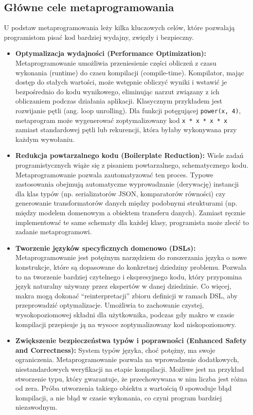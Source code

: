 \subsection{Główne cele metaprogramowania}
U podstaw metaprogramowania leży kilka kluczowych celów, które pozwalają programistom pisać kod bardziej wydajny, zwięzły i bezpieczny.
\begin{itemize}
    \item \textbf{Optymalizacja wydajności (Performance Optimization):}
    Metaprogramowanie umożliwia przeniesienie części obliczeń z czasu wykonania (runtime) do czasu kompilacji (compile-time).
    Kompilator, mając dostęp do stałych wartości, może wstępnie obliczyć wyniki i wstawić je bezpośrednio do kodu wynikowego, eliminując narzut związany z ich obliczaniem podczas działania aplikacji.
    Klasycznym przykładem jest rozwijanie pętli (ang. loop unrolling).
    Dla funkcji potęgującej \verb|power(x, 4)|, metaprogram może wygenerować zoptymalizowany kod \verb|x * x * x * x| zamiast standardowej pętli lub rekurencji, która byłaby wykonywana przy każdym wywołaniu.
    \item \textbf{Redukcja powtarzalnego kodu (Boilerplate Reduction):}
    Wiele zadań programistycznych wiąże się z pisaniem powtarzalnego, schematycznego kodu.
    Metaprogramowanie pozwala zautomatyzować ten proces.
    Typowe zastosowania obejmują automatyczne wyprowadzanie (derywację) instancji dla klas typów (np. serializatorów JSON, komparatorów równości) czy generowanie transformatorów danych między podobnymi strukturami (np. między modelem domenowym a obiektem transferu danych).
    Zamiast ręcznie implementować te same schematy dla każdej klasy, programista może zlecić to zadanie metaprogramowi.
    \item \textbf{Tworzenie języków specyficznych domenowo (DSLs):}
    Metaprogramowanie jest potężnym narzędziem do rozszerzania języka o nowe konstrukcje, które są dopasowane do konkretnej dziedziny problemu.
    Pozwala to na tworzenie bardziej czytelnego i ekspresyjnego kodu, który przypomina język naturalny używany przez ekspertów w danej dziedzinie.
    Co więcej, makra mogą dokonać \enquote{reinterpretacji} zbioru definicji w ramach DSL, aby przeprowadzić optymalizacje.
    Umożliwia to zachowanie czystej, wysokopoziomowej składni dla użytkownika, podczas gdy makro w czasie kompilacji przepisuje ją na wysoce zoptymalizowany kod niskopoziomowy.
    \item \textbf{Zwiększenie bezpieczeństwa typów i poprawności (Enhanced Safety and Correctness):}
    System typów języka, choć potężny, ma swoje ograniczenia.
    Metaprogramowanie pozwala na wprowadzenie dodatkowych, niestandardowych weryfikacji na etapie kompilacji.
    Możliwe jest na przykład stworzenie typu, który gwarantuje, że przechowywana w nim liczba jest różna od zera.
    Próba utworzenia takiego obiektu z wartością 0 spowoduje błąd kompilacji, a nie błąd w czasie wykonania, co czyni program bardziej niezawodnym.
\end{itemize}


